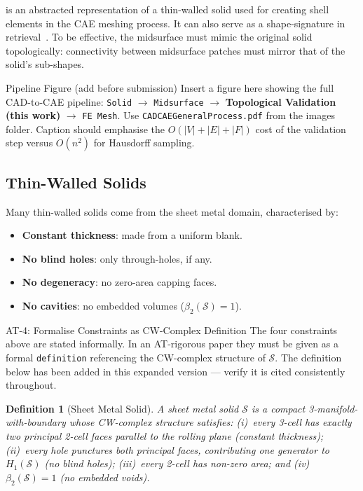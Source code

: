 \documentclass[journal,twocolumn,10pt]{IEEEtran}
\newtheorem{definition}[theorem]{Definition}
\newcommand{\Hk}[1]{H_{#1}}
\newcommand{\Betti}[1]{\beta_{#1}}
\begin{document}
 is an abstracted representation of a thin-walled
solid used for creating shell elements in the CAE meshing process. It can also
serve as a shape-signature in retrieval~\cite{Rezayat1996}. To be effective,
the midsurface must mimic the original solid topologically: connectivity
between midsurface patches must mirror that of the solid's sub-shapes.

\begin{addblock}{Pipeline Figure (add before submission)}
Insert a figure here showing the full CAD-to-CAE pipeline:
\texttt{Solid} $\to$ \texttt{Midsurface} $\to$ \textbf{Topological
Validation (this work)} $\to$ \texttt{FE Mesh}. Use
\texttt{CADCAEGeneralProcess.pdf} from the images folder. Caption should
emphasise the $O(|V|+|E|+|F|)$ cost of the validation step versus $O(n^2)$
for Hausdorff sampling.
\end{addblock}

\subsection{Thin-Walled Solids}

Many thin-walled solids come from the sheet metal domain, characterised by:
\begin{itemize}[noitemsep,topsep=2pt,leftmargin=*]
\item \textbf{Constant thickness}: made from a uniform blank.
\item \textbf{No blind holes}: only through-holes, if any.
\item \textbf{No degeneracy}: no zero-area capping faces.
\item \textbf{No cavities}: no embedded volumes ($\Betti{2}(\mathcal{S})=1$).
\end{itemize}

\begin{atblock}{AT-4: Formalise Constraints as CW-Complex Definition}
The four constraints above are stated informally. In an AT-rigorous paper
they must be given as a formal \texttt{definition} referencing the CW-complex
structure of $\mathcal{S}$. The definition below has been added in this
expanded version --- verify it is cited consistently throughout.
\end{atblock}

\begin{definition}[Sheet Metal Solid]\label{def:sheetmetal}
A \emph{sheet metal solid} $\mathcal{S}$ is a compact 3-manifold-with-boundary
whose CW-complex structure satisfies: (i)~every 3-cell has exactly two
principal 2-cell faces parallel to the rolling plane (constant thickness);
(ii)~every hole punctures both principal faces, contributing one generator to
$\Hk{1}(\mathcal{S})$ (no blind holes); (iii)~every 2-cell has non-zero area;
and (iv)~$\Betti{2}(\mathcal{S})=1$ (no embedded voids).
\end{definition}
\end{document}
